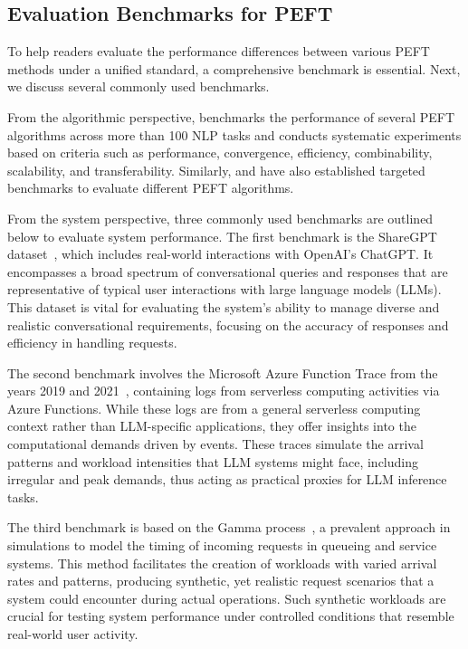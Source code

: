 \subsection{Evaluation Benchmarks for PEFT}
\label{sec: system benchmark}
To help readers evaluate the performance differences between various PEFT methods under a unified standard, a comprehensive benchmark is essential. Next, we discuss several commonly used benchmarks.

From the algorithmic perspective,  \cite{ding2023parameter} benchmarks the performance of several PEFT algorithms across more than 100 NLP tasks and conducts systematic experiments based on criteria such as performance, convergence, efficiency, combinability, scalability, and transferability. Similarly, \cite{xu2023parameter} and \cite{pu2023empirical} have also established targeted benchmarks to evaluate different PEFT algorithms.

From the system perspective, three commonly used benchmarks are outlined below to evaluate system performance.
The first benchmark is the ShareGPT dataset~\cite{ShareGPT}, which includes real-world interactions with OpenAI's ChatGPT. It encompasses a broad spectrum of conversational queries and responses that are representative of typical user interactions with large language models (LLMs). This dataset is vital for evaluating the system's ability to manage diverse and realistic conversational requirements, focusing on the accuracy of responses and efficiency in handling requests.

The second benchmark involves the Microsoft Azure Function Trace from the years 2019 and 2021~\cite{MicrosoftAzureFunctionTrace}, containing logs from serverless computing activities via Azure Functions. While these logs are from a general serverless computing context rather than LLM-specific applications, they offer insights into the computational demands driven by events. These traces simulate the arrival patterns and workload intensities that LLM systems might face, including irregular and peak demands, thus acting as practical proxies for LLM inference tasks.

The third benchmark is based on the Gamma process~\cite{gamaprocess}, a prevalent approach in simulations to model the timing of incoming requests in queueing and service systems. This method facilitates the creation of workloads with varied arrival rates and patterns, producing synthetic, yet realistic request scenarios that a system could encounter during actual operations. Such synthetic workloads are crucial for testing system performance under controlled conditions that resemble real-world user activity.
